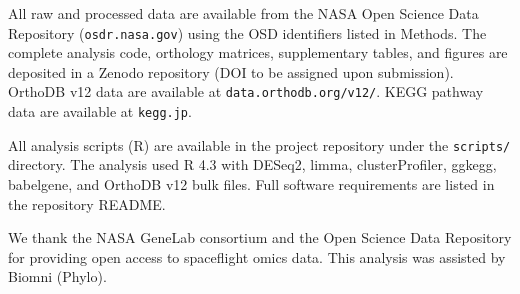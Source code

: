 \documentclass[pdflatex,sn-nature]{sn-jnl}
\begin{document}
\backmatter

All raw and processed data are available from the NASA Open Science Data
Repository (\texttt{osdr.nasa.gov}) using the OSD identifiers listed in Methods.
The complete analysis code, orthology matrices, supplementary tables, and figures
are deposited in a Zenodo repository (DOI to be assigned upon submission). OrthoDB
v12 data are available at \texttt{data.orthodb.org/v12/}. KEGG pathway data are
available at \texttt{kegg.jp}.

All analysis scripts (R) are available in the project repository under the
\texttt{scripts/} directory. The analysis used R 4.3 with DESeq2, limma,
clusterProfiler, ggkegg, babelgene, and OrthoDB v12 bulk files. Full software
requirements are listed in the repository README.

We thank the NASA GeneLab consortium and the Open Science Data Repository for
providing open access to spaceflight omics data. This analysis was assisted by
Biomni (Phylo).



\end{document}
